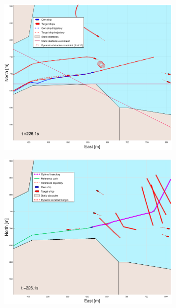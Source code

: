\begin{figure}[ht!]\ContinuedFloat
    \begin{subfigure}[b]{0.49\textwidth}
        \centering
        \includegraphics[width=\textwidth]{Images/Figures/Trheimfjord/_Simple_0fig1_time=226}
    \end{subfigure}
    \hfill
    \begin{subfigure}[b]{0.499\textwidth}
        \centering
        \includegraphics[width=\textwidth]{Images/Figures/Trheimfjord/_Simple_0fig999_time=226}

\end{subfigure}
\end{figure}
